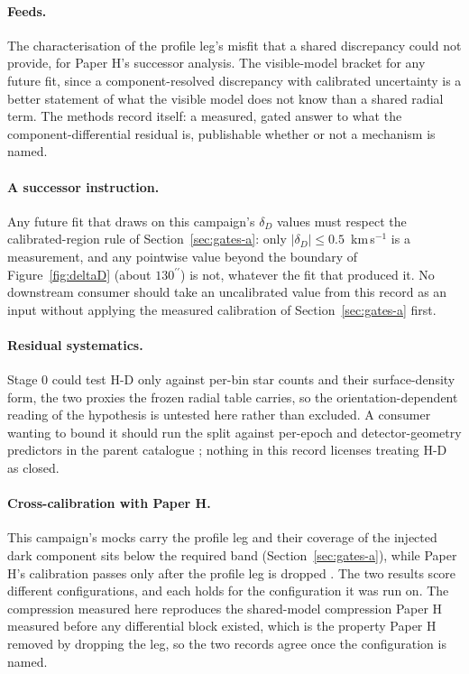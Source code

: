 \documentclass[11pt]{article}
\newcommand{\as}{\ensuremath{^{\prime\prime}}}
\newcommand{\dD}{\ensuremath{\delta_D}}
\begin{document}
\paragraph{Feeds.} The characterisation of the profile leg's misfit that a shared discrepancy could not provide, for Paper H's successor analysis. The visible-model bracket for any future fit, since a component-resolved discrepancy with calibrated uncertainty is a better statement of what the visible model does not know than a shared radial term. The methods record itself: a measured, gated answer to what the component-differential residual is, publishable whether or not a mechanism is named.

\paragraph{A successor instruction.} Any future fit that draws on this campaign's \dD{} values must respect the calibrated-region rule of Section~\ref{sec:gates-a}: only $|\dD| \leq 0.5$~km\,s$^{-1}$ is a measurement, and any pointwise value beyond the boundary of Figure~\ref{fig:deltaD} (about $130\as$) is not, whatever the fit that produced it. No downstream consumer should take an uncalibrated value from this record as an input without applying the measured calibration of Section~\ref{sec:gates-a} first.

\paragraph{Residual systematics.} Stage 0 could test H-D only against per-bin star counts and their surface-density form, the two proxies the frozen radial table carries, so the orientation-dependent reading of the hypothesis is untested here rather than excluded. A consumer wanting to bound it should run the split against per-epoch and detector-geometry predictors in the parent catalogue \citep{Haberle2024oMEGACatII,Haberle2025oMEGACatVI}; nothing in this record licenses treating H-D as closed.

\paragraph{Cross-calibration with Paper H.} This campaign's mocks carry the profile leg and their coverage of the injected dark component sits below the required band (Section~\ref{sec:gates-a}), while Paper H's calibration passes only after the profile leg is dropped \citep{HCalReport2026}. The two results score different configurations, and each holds for the configuration it was run on. The compression measured here reproduces the shared-model compression Paper H measured before any differential block existed, which is the property Paper H removed by dropping the leg, so the two records agree once the configuration is named.
\end{document}

